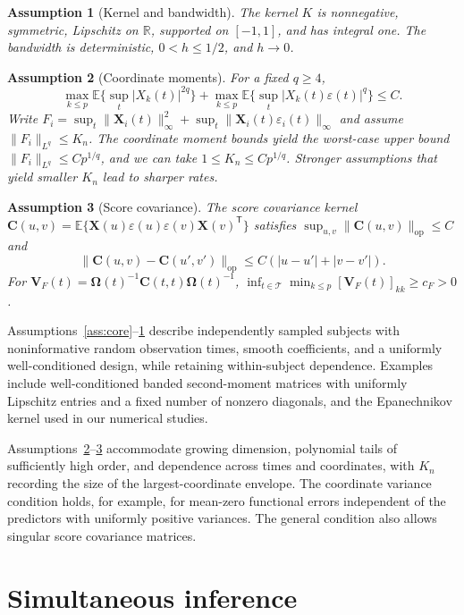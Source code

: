 \documentclass[12pt]{article}
\newtheorem{assumption}{Assumption}
\newcommand{\bC}{{\mathbf C}}
\newcommand{\bV}{{\mathbf V}}
\newcommand{\bX}{{\mathbf X}}
\newcommand{\bOmega} {\boldsymbol{\Omega}}
\newcommand{\expect}{\mathbb{E}}
\newcommand{\trans}{{\scriptscriptstyle\mathsf{T}}}
\numberwithin{equation}{section}
\begin{document}
\begin{assumption}[Kernel and bandwidth]\label{ass:kernel}
The kernel $K$ is nonnegative, symmetric, Lipschitz on $\mathbb R$,
supported on $[-1,1]$, and has integral one. The bandwidth is
deterministic, $0<h\le1/2$, and $h\to0$.
\end{assumption}

\begin{assumption}[Coordinate moments]\label{ass:moments}
For a fixed $q\ge4$,
\[
\max_{k\le p}\expect\{\sup_t|X_k(t)|^{2q}\}
+\max_{k\le p}\expect\{\sup_t|X_k(t)\varepsilon(t)|^q\}\le C.
\]
Write $F_i=\sup_t\|\bX_i(t)\|_\infty^2+
\sup_t\|\bX_i(t)\varepsilon_i(t)\|_\infty$ and assume
$\|F_i\|_{L^q}\le K_n$.
The coordinate moment bounds yield the worst-case upper bound
$\|F_i\|_{L^q}\le Cp^{1/q}$, and we can take $1\le K_n\le Cp^{1/q}$. Stronger assumptions that yield smaller
$K_n$ lead to sharper rates.
\end{assumption}

\begin{assumption}[Score covariance]\label{ass:covariance}
The score covariance kernel
$\bC(u,v)=\expect\{\bX(u)\varepsilon(u)\varepsilon(v)\bX(v)^\trans\}$
satisfies $\sup_{u,v}\|\bC(u,v)\|_{\mathrm{op}}\le C$ and
\[
\|\bC(u,v)-\bC(u',v')\|_{\mathrm{op}}
\le C(|u-u'|+|v-v'|).
\]
For $\bV_F(t)=\bOmega(t)^{-1}\bC(t,t)\bOmega(t)^{-1}$,
$\inf_{t\in\mathcal T}\min_{k\le p}[\bV_F(t)]_{kk}\ge c_F>0$.
\end{assumption}

Assumptions~\ref{ass:core}--\ref{ass:kernel} describe independently
sampled subjects with noninformative random observation times, smooth
coefficients, and a uniformly well-conditioned design, while retaining
within-subject dependence. Examples include well-conditioned banded
second-moment matrices with uniformly Lipschitz entries and a fixed
number of nonzero diagonals, and the Epanechnikov kernel used in our
numerical studies.

Assumptions~\ref{ass:moments}--\ref{ass:covariance} accommodate growing
dimension, polynomial tails of sufficiently high order, and dependence
across times and coordinates, with $K_n$ recording the size of the
largest-coordinate envelope. The coordinate variance condition holds,
for example, for mean-zero functional errors independent of the
predictors with uniformly positive variances. The general condition
also allows singular score covariance matrices.

\section{Simultaneous inference}\label{sec:theory}
\end{document}
